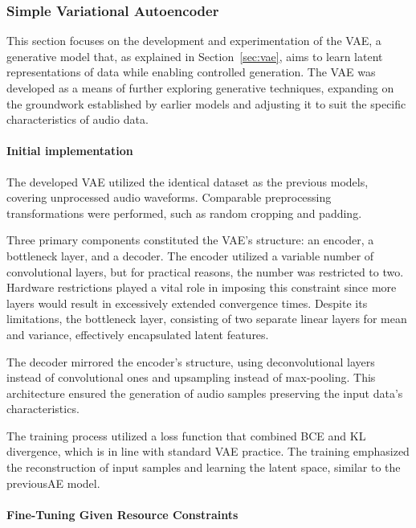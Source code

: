 \subsubsection{Simple Variational Autoencoder} \label{sec:training-vae}

This section focuses on the development and experimentation of the \ac{VAE}, a generative model that, as explained in Section~\ref{sec:vae}, aims to learn latent representations of data while enabling controlled generation. The \ac{VAE} was developed as a means of further exploring generative techniques, expanding on the groundwork established by earlier models and adjusting it to suit the specific characteristics of audio data.

\paragraph{Initial implementation}

The developed \ac{VAE} utilized the identical dataset as the previous models, covering unprocessed audio waveforms. Comparable preprocessing transformations were performed, such as random cropping and padding.

Three primary components constituted the \ac{VAE}'s structure: an encoder, a bottleneck layer, and a decoder. The encoder utilized a variable number of convolutional layers, but for practical reasons, the number was restricted to two. Hardware restrictions played a vital role in imposing this constraint since more layers would result in excessively extended convergence times. Despite its limitations, the bottleneck layer, consisting of two separate linear layers for mean and variance, effectively encapsulated latent features.

The decoder mirrored the encoder's structure, using deconvolutional layers instead of convolutional ones and upsampling instead of max-pooling. This architecture ensured the generation of audio samples preserving the input data's characteristics.

The training process utilized a loss function that combined \ac{BCE} and \ac{KL} divergence, which is in line with standard \ac{VAE} practice. The training emphasized the reconstruction of input samples and learning the latent space, similar to the previous\ac{AE} model.

\paragraph{Fine-Tuning Given Resource Constraints}

